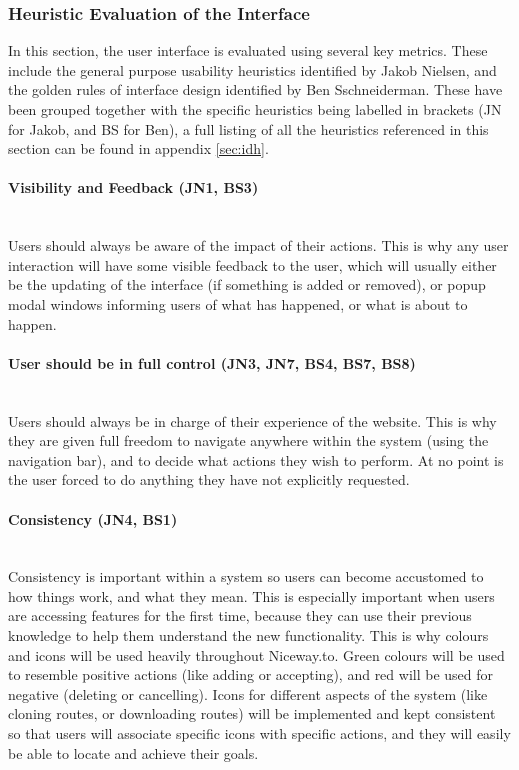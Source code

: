 \subsubsection{Heuristic Evaluation of the Interface}
In this section, the user interface is evaluated using several key metrics. These include the general purpose usability heuristics identified by Jakob Nielsen\cite{nielsen199510}, and the golden rules of interface design identified by Ben Sschneiderman\cite{shneiderman2005designing}. These have been grouped together with the specific heuristics being labelled in brackets (JN for Jakob, and BS for Ben), a full listing of all the heuristics referenced in this section can be found in appendix \ref{sec:idh}.

\newpage 
\paragraph{Visibility and Feedback (JN1, BS3)}\ \\
Users should always be aware of the impact of their actions. This is why any user interaction will have some visible feedback to the user, which will usually either be the updating of the interface (if something is added or removed), or popup modal windows informing users of what has happened, or what is about to happen.

\paragraph{User should be in full control (JN3, JN7, BS4, BS7, BS8)}\ \\
Users should always be in charge of their experience of the website. This is why they are given full freedom to navigate anywhere within the system (using the navigation bar), and to decide what actions they wish to perform. At no point is the user forced to do anything they have not explicitly requested.

\paragraph{Consistency (JN4, BS1)}\ \\
Consistency is important within a system so users can become accustomed to how things work, and what they mean. This is especially important when users are accessing features for the first time, because they can use their previous knowledge to help them understand the new functionality. This is why colours and icons will be used heavily throughout Niceway.to. Green colours will be used to resemble positive actions (like adding or accepting), and red will be used for negative (deleting or cancelling). Icons for different aspects of the system (like cloning routes, or downloading routes) will be implemented and kept consistent so that users will associate specific icons with specific actions, and they will easily be able to locate and achieve their goals.


